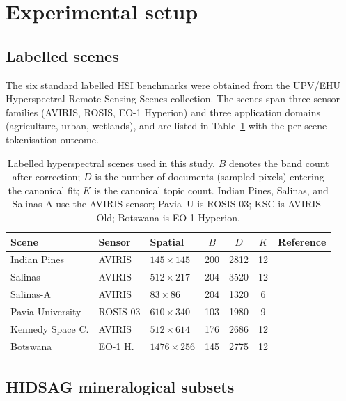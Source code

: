 \documentclass[journal,a4paper,10pt]{IEEEtran}
\begin{document}
\section{Experimental setup}
\label{sec:setup}

\subsection{Labelled scenes}

The six standard labelled HSI benchmarks were obtained from the UPV/EHU
Hyperspectral Remote Sensing Scenes collection. The scenes span three
sensor families (AVIRIS, ROSIS, EO-1 Hyperion) and three application
domains (agriculture, urban, wetlands), and are listed in
Table~\ref{tab:scenes} with the per-scene tokenisation outcome.

\begin{table}[t]
\caption{Labelled hyperspectral scenes used in this study. $B$
denotes the band count after correction; $D$ is the number of
documents (sampled pixels) entering the canonical fit; $K$ is the
canonical topic count. Indian Pines, Salinas, and Salinas-A use the
AVIRIS sensor; Pavia~U is ROSIS-03; KSC is AVIRIS-Old; Botswana is
EO-1 Hyperion.}
\label{tab:scenes}
\centering
\small
\begin{tabular}{lllccc l}
\toprule
Scene & Sensor & Spatial & $B$ & $D$ & $K$ & Reference \\
\midrule
Indian Pines       & AVIRIS  & $145 \times 145$  & 200 & 2812 & 12 & \cite{baumgardner1992indianpines} \\
Salinas            & AVIRIS  & $512 \times 217$  & 204 & 3520 & 12 & \cite{aviris_salinas} \\
Salinas-A          & AVIRIS  & $83  \times 86$   & 204 & 1320 & 6  & \cite{aviris_salinas} \\
Pavia University   & ROSIS-03& $610 \times 340$  & 103 & 1980 & 9  & \cite{rosis_pavia} \\
Kennedy Space C.   & AVIRIS  & $512 \times 614$  & 176 & 2686 & 12 & \cite{aviris_ksc} \\
Botswana           & EO-1 H. & $1476\times 256$  & 145 & 2775 & 12 & \cite{eo1_botswana} \\
\bottomrule
\end{tabular}
\end{table}

\subsection{HIDSAG mineralogical subsets}
\end{document}
